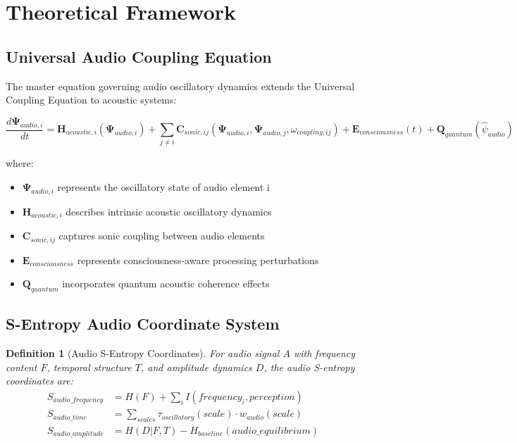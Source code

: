 \documentclass[12pt,a4paper]{article}
\newtheorem{definition}{Definition}
\begin{document}
\section{Theoretical Framework}

\subsection{Universal Audio Coupling Equation}

The master equation governing audio oscillatory dynamics extends the Universal Coupling Equation to acoustic systems:

\begin{equation}
\frac{d\mathbf{\Psi}_{audio,i}}{dt} = \mathbf{H}_{acoustic,i}(\mathbf{\Psi}_{audio,i}) + \sum_{j \neq i} \mathbf{C}_{sonic,ij}(\mathbf{\Psi}_{audio,i}, \mathbf{\Psi}_{audio,j}, \omega_{coupling,ij}) + \mathbf{E}_{consciousness}(t) + \mathbf{Q}_{quantum}(\hat{\psi}_{audio})
\label{eq:audio_master_oscillation}
\end{equation}

where:
\begin{itemize}
\item $\mathbf{\Psi}_{audio,i}$ represents the oscillatory state of audio element i
\item $\mathbf{H}_{acoustic,i}$ describes intrinsic acoustic oscillatory dynamics
\item $\mathbf{C}_{sonic,ij}$ captures sonic coupling between audio elements
\item $\mathbf{E}_{consciousness}$ represents consciousness-aware processing perturbations
\item $\mathbf{Q}_{quantum}$ incorporates quantum acoustic coherence effects
\end{itemize}

\subsection{S-Entropy Audio Coordinate System}

\begin{definition}[Audio S-Entropy Coordinates]
For audio signal $A$ with frequency content $F$, temporal structure $T$, and amplitude dynamics $D$, the audio S-entropy coordinates are:
\begin{align}
S_{audio\_frequency} &= H(F) + \sum_{i} I(frequency_i, perception) \\
S_{audio\_time} &= \sum_{scales} \tau_{oscillatory}(scale) \cdot w_{audio}(scale) \\
S_{audio\_amplitude} &= H(D|F,T) - H_{baseline}(audio\_equilibrium)
\end{align}
\end{definition}
\end{document}
